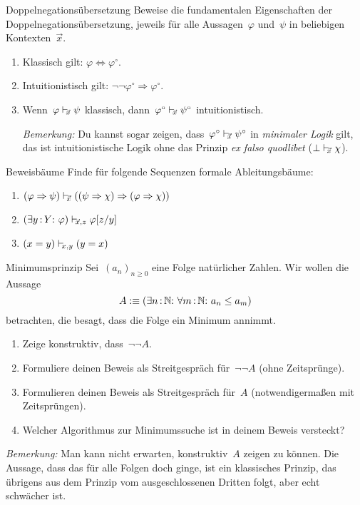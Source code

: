 \documentclass{pizzablatt}
\begin{document}

\begin{aufgabe}{Doppelnegationsübersetzung}
Beweise die fundamentalen Eigenschaften der Doppelnegationsübersetzung, jeweils für alle
Aussagen~$\varphi$ und~$\psi$ in beliebigen Kontexten~$\vec x$.
\begin{enumerate}
\item Klassisch gilt: $\varphi \Longleftrightarrow \varphi^\circ$.
\item Intuitionistisch gilt: $\neg\neg\varphi^\circ \Longrightarrow
\varphi^\circ$.
\item Wenn~$\varphi \mathrel{\vdash\!\!\!_{\vec x}} \psi$ klassisch, dann~$\varphi^\circ \mathrel{\vdash\!\!\!_{\vec
x}} \psi^\circ$ intuitionistisch.

\emph{Bemerkung:} Du kannst sogar zeigen, dass~$\varphi^\circ \mathrel{\vdash\!\!\!_{\vec x}}
\psi^\circ$ in \emph{minimaler Logik} gilt, das ist intuitionistische Logik
ohne das Prinzip \emph{ex falso quodlibet} ($\bot \mathrel{\vdash\!\!\!_{\vec x}} \chi$).
\end{enumerate}
\end{aufgabe}

\begin{aufgabe}{Beweisbäume}
Finde für folgende Sequenzen formale Ableitungsbäume:
\begin{enumerate}
\item $(\varphi \Rightarrow \psi) \mathrel{\vdash\!\!\!_{\vec x}} ((\psi \Rightarrow \chi)
\Rightarrow (\varphi \Rightarrow \chi))$
\item $(\exists y\,{:}\,Y{:}\ \varphi) \mathrel{\vdash\!\!\!_{\vec x,z}} \varphi[z/y]$
\item $(x = y) \mathrel{\vdash\!\!\!_{x,y}} (y = x)$
\end{enumerate}
\end{aufgabe}

\begin{aufgabe}{Minimumsprinzip}
Sei~$(a_n)_{n \geq 0}$ eine Folge natürlicher Zahlen. Wir wollen die Aussage
\[ A :\equiv (\exists n\?\NN{:}\ \forall m\?\NN{:}\ a_n \leq a_m) \]
betrachten, die besagt, dass die Folge ein Minimum annimmt.

\begin{enumerate}
\item Zeige konstruktiv, dass~$\neg\neg A$.
\item Formuliere deinen Beweis als Streitgespräch für~$\neg\neg A$ (ohne
Zeitsprünge).
\item Formulieren deinen Beweis als Streitgespräch für~$A$ (notwendigermaßen
mit Zeitsprüngen).
\item Welcher Algorithmus zur Minimumssuche ist in deinem Beweis versteckt?
\end{enumerate}

\emph{Bemerkung:} Man kann nicht erwarten,
konstruktiv~$A$ zeigen zu können. Die Aussage, dass das für alle Folgen doch
ginge, ist ein klassisches Prinzip, das übrigens aus dem Prinzip vom
ausgeschlossenen Dritten folgt, aber echt schwächer ist.
\end{aufgabe}
\end{document}
